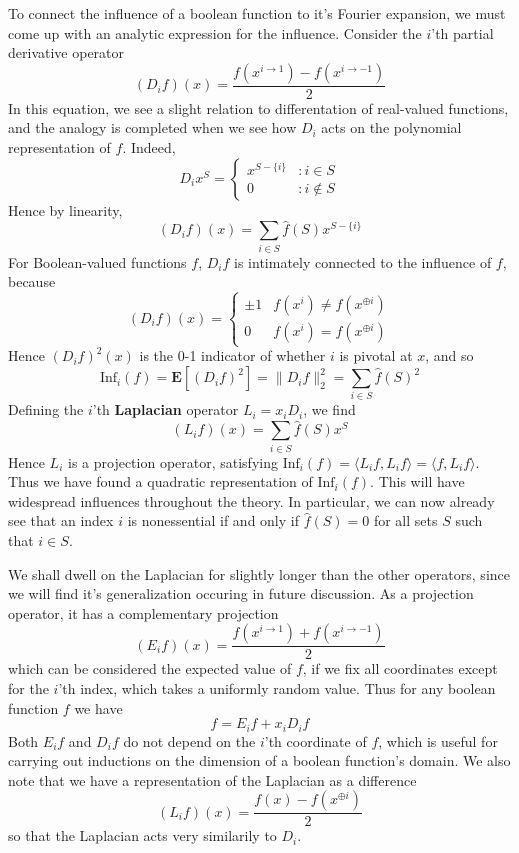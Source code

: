 To connect the influence of a boolean function to it's Fourier expansion, we must come up with an analytic expression for the influence. Consider the $i$'th partial derivative operator
%
\[ (D_if)(x) = \frac{f(x^{i \to 1}) - f(x^{i \to -1})}{2} \]
%
In this equation, we see a slight relation to differentation of real-valued functions, and the analogy is completed when we see how $D_i$ acts on the polynomial representation of $f$. Indeed,
%
\[ D_ix^S = \begin{cases} x^{S - \{ i \}} & : i \in S \\ 0 & : i \not \in S \end{cases} \]
%
Hence by linearity,
%
\[ (D_if)(x) = \sum_{i \in S} \widehat{f}(S) x^{S - \{ i \}} \]
%
For Boolean-valued functions $f$, $D_if$ is intimately connected to the influence of $f$, because
%
\[ (D_if)(x) = \begin{cases} \pm 1 & f(x^i) \neq f(x^{\oplus i}) \\ 0 & f(x^i) = f(x^{\oplus i}) \end{cases} \]
%
Hence $(D_if)^2(x)$ is the 0-1 indicator of whether $i$ is pivotal at $x$, and so
%
\[ \text{Inf}_i(f) = \mathbf{E}[(D_if)^2] = \| D_if \|_2^2 = \sum_{i \in S} \widehat{f}(S)^2 \]
%
Defining the $i$'th {\bf Laplacian} operator $L_i = x_i D_i$, we find
%
\[ (L_i f)(x) = \sum_{i \in S} \widehat{f}(S) x^S \]
%
Hence $L_i$ is a projection operator, satisfying $\text{Inf}_i(f) = \langle L_i f, L_i f \rangle = \langle f, L_i f \rangle$. Thus we have found a quadratic representation of $\text{Inf}_i(f)$. This will have widespread influences throughout the theory. In particular, we can now already see that an index $i$ is nonessential if and only if $\widehat{f}(S) = 0$ for all sets $S$ such that $i \in S$.

We shall dwell on the Laplacian for slightly longer than the other operators, since we will find it's generalization occuring in future discussion. As a projection operator, it has a complementary projection
%
\[ (E_i f)(x) = \frac{f(x^{i \to 1}) + f(x^{i \to -1})}{2} \]
%
which can be considered the expected value of $f$, if we fix all coordinates except for the $i$'th index, which takes a uniformly random value. Thus for any boolean function $f$ we have
%
\[ f = E_i f + x_i D_i f \]
%
Both $E_i f$ and $D_i f$ do not depend on the $i$'th coordinate of $f$, which is useful for carrying out inductions on the dimension of a boolean function's domain. We also note that we have a representation of the Laplacian as a difference
%
\[ (L_i f)(x) = \frac{f(x) - f(x^{\oplus i})}{2} \]
%
so that the Laplacian acts very similarily to $D_i$.

